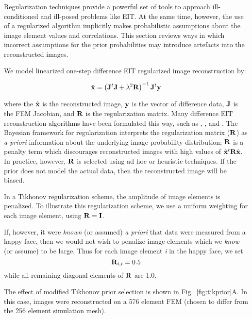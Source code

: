 \documentclass[12pt]{iopart}
\begin{document}
Regularization techniques provide a powerful set of tools
to approach ill-conditioned and ill-posed problems like
EIT. At the same time, however, the use of a regularized
algorithm implicitly makes probabilistic assumptions
about the image element values and correlations. 
This section reviews ways in which incorrect assumptions for
the prior probabilities may introduce artefacts into 
the reconstructed images.

We model linearized one-step difference
EIT regularized image reconstruction
by:

\begin{equation}
   \hat{\bf x} = 
   \left({\bf J}^t{\bf J} + \lambda^2{\bf R}\right)^{-1}
         {\bf J}^t{\bf y}
\end{equation}

where the $\hat{\bf x}$ is the reconstructed image, 
$\bf y$ is the vector of difference data,
$\bf J$ is the FEM Jacobian, 
and $\bf R$ is the regularization matrix. Many 
difference EIT reconstruction algorithms have been
formulated this way, such as
\cite{Cheney_etal_1990}, \cite{Adler_and_Guardo_1996},
and \cite{Polydorides_2002}.
The Bayesian framework for regularization interprets
the regularization matrix ($\bf R$) as {\em a priori} information 
about the underlying image probability distribution;
$\bf R$ is a penalty term which discourages reconstructed
images with high values of $\hat{\bf x}^t{\bf R}\hat{\bf x}$.
In practice, however, $\bf R$ is selected using
ad hoc or heuristic techniques. If the prior does
not model the actual data, then the reconstructed
image will be biased.

In a Tikhonov regularization scheme, the amplitude
of image elements is penalized. To illustrate
this regularization scheme, we use a uniform
weighting for each image element, using ${\bf R} = {\bf I}$.

If, however, it were {\em known} (or assumed) {\em a priori} that 
data were measured from a happy face, then we 
would not wish to penalize image elements which we
{\em know} (or assume) to be large. Thus for each image element {\em i}
in the happy face, we set 
\begin{equation}
   {\bf R}_{i,i} = 0.5
\end{equation}
while all remaining diagonal elements of $\bf R$ are $1.0$.

The effect of modified Tikhonov prior selection is shown in
Fig.~\ref{fig:tikprior}A.
In this case, images were reconstructed on a 576 element
FEM (chosen to differ from the 256 element simulation mesh).
\end{document}
